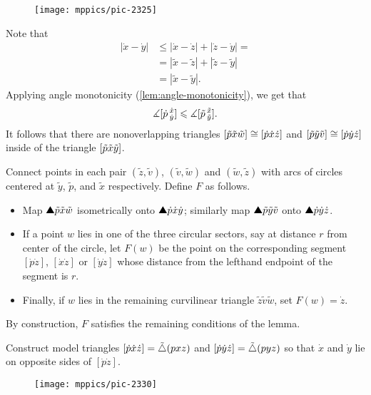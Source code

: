 \begin{wrapfigure}{r}{45 mm}
\vskip-4mm
\centering
\texttt{[image: mppics/pic-2325]}
\end{wrapfigure}

Note that 
\begin{align*}
|\dot x-\dot y|&\le |\dot x-\dot z|+|\dot z-\dot y|=
\\
&=|\tilde  x-\tilde  z|+|\tilde  z-\tilde  y|
\\
&=|\tilde  x-\tilde  y|.
\end{align*}
Applying angle monotonicity (\ref{lem:angle-monotonicity}), we get that
\[\measuredangle[\dot p\,{}^{\dot x}_{\dot y}]\leqslant \measuredangle[\tilde  p\,{}^{\tilde  x}_{\tilde  y}].\]
It follows that there are nonoverlapping triangles 
$[\tilde p{\tilde x}{\tilde w}]\cong[\dot p{\dot x}{\dot z}]$ 
and 
$[\tilde p{\tilde y}{\tilde v}]\cong[\dot p{\dot y}{\dot z}]$
 inside of the triangle $[\tilde p{\tilde x}{\tilde y}]$.


Connect points in each pair
$(\tilde z,\tilde v)$, 
$(\tilde v,\tilde w)$ 
and $(\tilde w,\tilde z)$ 
with arcs of circles centered at 
$\tilde y$, $\tilde p$, and $\tilde x$ respectively. 
Define $F$ as follows.
\begin{itemize}
\item Map  $\solidtriangle{\tilde p}{\tilde x}{\tilde w}$ isometrically onto  $\solidtriangle {\dot p}{\dot x}{\dot y}$;
similarly map $\solidtriangle{\tilde p}{\tilde y}{\tilde v}$ onto $\solidtriangle {\dot p}{\dot y}{\dot z}$.
\item If a point $w$ lies in one of the three circular sectors, say at distance $r$ from center of the circle, let $F(w)$ be the point on the corresponding segment 
$[\dot p \dot z]$, 
$[\dot x \dot z]$ 
or $[\dot y \dot z]$ whose distance from the lefthand endpoint of the segment is $r$.
\item Finally, if $w$ lies in the remaining curvilinear triangle $\tilde z \tilde v \tilde w$, 
set $F(w) =\dot z$. 
\end{itemize}
By construction, $F$ satisfies the remaining conditions of the lemma. 
\qeds


Construct model triangles $\trig{\dot p}{\dot x}{\dot z}\z=\modtrig(p x z)$ 
and $[\dot p{\dot y}{\dot z}]=\tilde\triangle(p y z)$ so that $\dot x$ and $\dot y$ lie on opposite sides of $[\dot p\dot z]$.

\begin{wrapfigure}{r}{30 mm}
\vskip-0mm
\centering
\texttt{[image: mppics/pic-2330]}
\end{wrapfigure}


